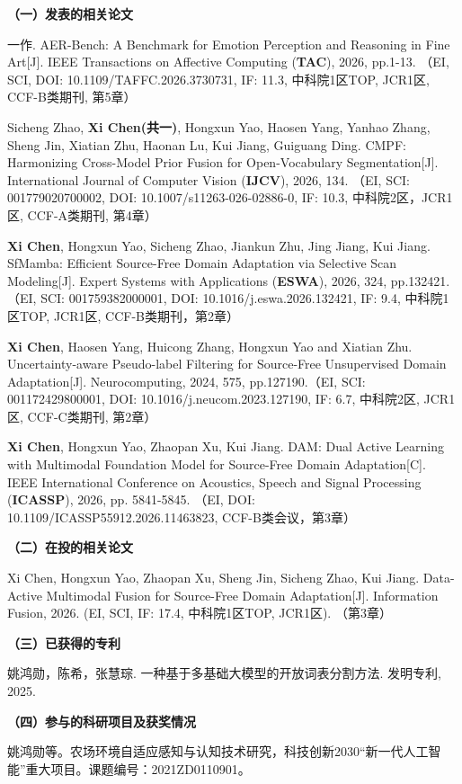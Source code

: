 
\begin{publication}
\noindent\textbf{（一）发表的相关论文}

\begin{publist}
\item 一作. AER-Bench: A Benchmark for Emotion Perception and Reasoning in Fine Art[J]. IEEE Transactions on Affective Computing (\textbf{TAC}), 2026, pp.1-13. （EI, SCI, DOI: 10.1109/TAFFC.2026.3730731, IF: 11.3, 中科院1区TOP, JCR1区, CCF-B类期刊, 第5章）
\item Sicheng Zhao, \textbf{Xi Chen(共一)}, Hongxun Yao, Haosen Yang, Yanhao Zhang, Sheng Jin, Xiatian Zhu, Haonan Lu, Kui Jiang, Guiguang Ding. CMPF: Harmonizing Cross-Model Prior Fusion for Open-Vocabulary Segmentation[J]. International Journal of Computer Vision (\textbf{IJCV}), 2026, 134. （EI, SCI: 001779020700002, DOI: 10.1007/s11263-026-02886-0, IF: 10.3, 中科院2区，JCR1区, CCF-A类期刊, 第4章）
\item \textbf{Xi Chen}, Hongxun Yao, Sicheng Zhao, Jiankun Zhu, Jing Jiang, Kui Jiang. SfMamba: Efficient Source-Free Domain Adaptation via Selective Scan Modeling[J]. Expert Systems with Applications (\textbf{ESWA}), 2026, 324, pp.132421. （EI, SCI: 001759382000001, DOI: 10.1016/j.eswa.2026.132421, IF: 9.4, 中科院1区TOP, JCR1区, CCF-B类期刊，第2章）
\item \textbf{Xi Chen}, Haosen Yang, Huicong Zhang, Hongxun Yao and Xiatian Zhu. Uncertainty-aware Pseudo-label Filtering for Source-Free Unsupervised Domain Adaptation[J]. Neurocomputing, 2024, 575, pp.127190.（EI, SCI: 001172429800001, DOI: 10.1016/j.neucom.2023.127190, IF: 6.7, 中科院2区, JCR1区, CCF-C类期刊, 第2章）
\item \textbf{Xi Chen}, Hongxun Yao, Zhaopan Xu, Kui Jiang. DAM: Dual Active Learning with Multimodal Foundation Model for Source-Free Domain Adaptation[C]. IEEE International Conference on Acoustics, Speech and Signal Processing (\textbf{ICASSP}), 2026, pp. 5841-5845. （EI, DOI: 10.1109/ICASSP55912.2026.11463823, CCF-B类会议，第3章）
\end{publist}


\noindent\textbf{（二）在投的相关论文}

Xi Chen, Hongxun Yao, Zhaopan Xu, Sheng Jin, Sicheng Zhao, Kui Jiang. Data-Active Multimodal Fusion for Source-Free Domain Adaptation[J]. Information Fusion, 2026. (EI, SCI, IF: 17.4, 中科院1区TOP, JCR1区). （第3章）

\noindent\textbf{（三）已获得的专利}

 姚鸿勋，陈希，张慧琮. 一种基于多基础大模型的开放词表分割方法. 发明专利, 2025.

\noindent\textbf{（四）参与的科研项目及获奖情况}

姚鸿勋等。农场环境自适应感知与认知技术研究，科技创新2030“新一代人工智能”重大项目。课题编号：2021ZD0110901。

\end{publication}

